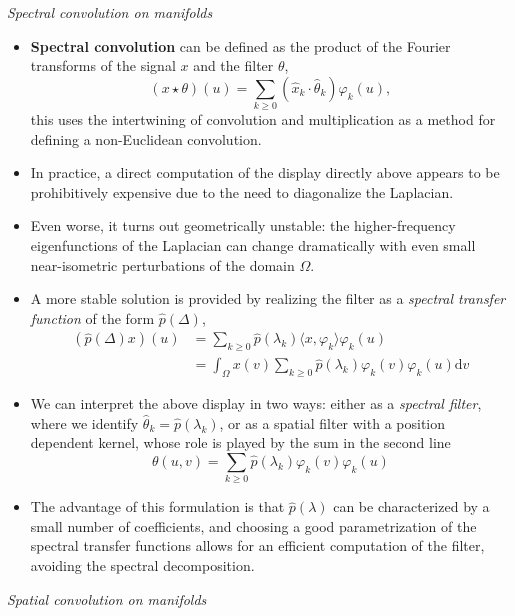\documentclass[12pt]{article}
\numberwithin{equation}{section}
\theoremstyle{definition}
\newcommand{		\n		}	{	\noindent					} %
\newcommand{		\ra		}	{	\rangle					}
\newcommand{		\la		}	{	\langle					}
\newcommand{		\B		}	{\textbf					} %
\newcommand{		\Oh		}	{	\Omega					}
\newcommand{		\1		}	{	\bm{1}					}%
\begin{document}
\n \hrulefill
\emph{ Spectral convolution on manifolds }
\hrulefill

\begin{itemize}
\item \B{Spectral convolution} can be defined as the product of the Fourier transforms of the signal $x$ and the filter $\theta$,
$$
( x \star \theta ) (u ) = \sum_{ k \geq 0} ( \hat{x}_k \cdot \hat{\theta}_k ) \varphi_k(u),
$$
this uses the intertwining of convolution and multiplication as a method for defining a non-Euclidean convolution. 
\item In practice, a direct computation of the display directly above appears to be prohibitively expensive due to the need to diagonalize the Laplacian. 
\item Even worse, it turns out geometrically unstable: the higher-frequency eigenfunctions of the Laplacian can change dramatically with even small near-isometric perturbations of the domain $\Oh$. 
\item A more stable solution is provided by realizing the filter as a \emph{spectral transfer function} of the form $\hat{p} (\Delta)$,
\begin{align*}
( \hat{p}(\Delta) x )(u) &= \sum_{ k\geq 0} \hat{p} (\lambda_k) \la x, \varphi_k \ra \varphi_k(u) \\
&= \int_\Oh x(v) \sum_{k \geq 0 } \hat{p} (\lambda_k) \varphi_k(v) \varphi_k(u) \textrm{d}v 
\end{align*}
\item We can interpret the above display in two ways: either as a \emph{spectral filter}, where we identify $\hat{\theta}_k = \hat{p} (\lambda_k)$, or as a spatial filter with a position dependent kernel, whose role is played by the sum in the second line
$$
\theta(u,v) = \sum_{k \geq 0 } \hat{p} ( \lambda_k ) \varphi_k(v) \varphi_k(u)
$$
\item The advantage of this formulation is that $\hat{p}(\lambda)$ can be characterized by a small number of coefficients, and choosing a good parametrization of the spectral transfer functions allows for an efficient computation of the filter, avoiding the spectral decomposition.
\end{itemize}

\n \hrulefill
\emph{ Spatial convolution on manifolds }
\hrulefill
\end{document}
